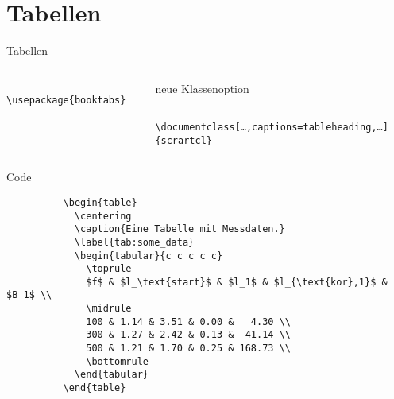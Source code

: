 \section{Tabellen}

\begin{frame}[fragile]{Tabellen}
  \begin{columns}[t]
    \begin{column}{0.31\textwidth}
      \begin{Packages}
        \begin{lstlisting}
          \usepackage{booktabs}
        \end{lstlisting}
      \end{Packages}
    \end{column}
    \begin{column}{0.63\textwidth}
    \begin{block}{neue Klassenoption}
      \begin{lstlisting}
        \documentclass[…,captions=tableheading,…]{scrartcl}
      \end{lstlisting}
    \end{block}
    \end{column}
  \end{columns}
  \vspace{-2pt}
  \begin{columns}[onlytextwidth, t]
    \begin{column}{0.60\textwidth}
      \fontsize{8}{6}
      \begin{block}{Code}
        \begin{lstlisting}
          \begin{table}
            \centering
            \caption{Eine Tabelle mit Messdaten.}
            \label{tab:some_data}
            \begin{tabular}{c c c c c}
              \toprule
              $f$ & $l_\text{start}$ & $l_1$ & $l_{\text{kor},1}$ & $B_1$ \\
              \midrule
              100 & 1.14 & 3.51 & 0.00 &   4.30 \\
              300 & 1.27 & 2.42 & 0.13 &  41.14 \\
              500 & 1.21 & 1.70 & 0.25 & 168.73 \\
              \bottomrule
            \end{tabular}
          \end{table}
        \end{lstlisting}
      \end{block}

\end{column}
\end{columns}
\end{frame}
